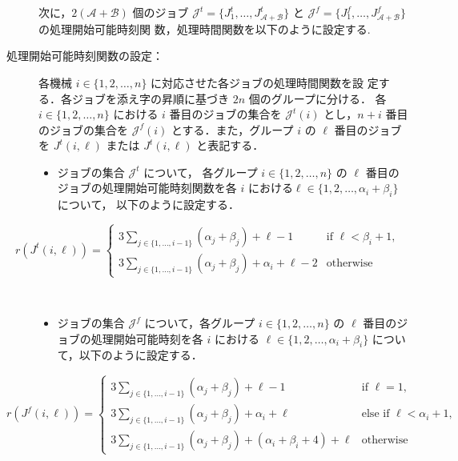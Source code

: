 \documentclass[12pt]{optlab-bachelor}
\begin{document}
\begin{description}
  \item[] 次に，$2(\mathcal{A} + \mathcal{B})$ 個のジョブ $\mathcal{J}^t =
  \{J^t_1,\ldots,J^t_{\mathcal{A} + \mathcal{B}}\}$ と $\mathcal{J}^f =
  \{J^f_1,\ldots,J^f_{\mathcal{A} + \mathcal{B}}\}$ の処理開始可能時刻関
  数，処理時間関数を以下のように設定する.
  \item[処理開始可能時刻関数の設定：] 各機械 $i \in \{1,2,\ldots,n\}$ に対応させた各ジョブの処理時間関数を設
  定する．各ジョブを添え字の昇順に基づき $2n$ 個のグループに分ける． 各 $i
  \in \{1,2,\ldots,n\}$ における $i$ 番目のジョブの集合を
  $\mathcal{J}^t(i)$ とし，$n + i$ 番目のジョブの集合を
  $\mathcal{J}^f(i)$ とする．また，グループ $i$ の $\ell$ 番目のジョブ
  を $J^t(i,\ell)$ または $J^t(i,\ell)$ と表記する．
  \begin{itemize}
    \item ジョブの集合 $\mathcal{J}^t$ について， 各グループ $i \in
    \{1,2,\ldots, n\}$ の $\ell$ 番目のジョブの処理開始可能時刻関数を各
    $i$ における$\ell \in \{1,2,\ldots, \alpha_i + \beta_i\}$ について，
    以下のように設定する．
  \end{itemize}
\end{description}
$$r(J^t(i,\ell)) =
\left\{ \begin{array}{lll} 3 \displaystyle
\sum_{j \in \{1,\ldots,i - 1\}}(\alpha_j + \beta_j) + \ell - 1 &
\text{if } \ell < \beta_i + 1, \\ 3 \displaystyle \sum_{j \in \{1,\ldots,i - 1\}}(\alpha_j + \beta_j) + \alpha_i + \ell - 2 & \text{otherwise} \end{array} \right.$$
\begin{description}
  \item[]~
  \begin{itemize}
    \item ジョブの集合 $\mathcal{J}^f$ について，各グループ $i \in \{1,2,\ldots, n\}$ の $\ell$ 番目のジョブの処理開始可能時刻を各 $i$ における $\ell \in \{1,2,\ldots,\alpha_i + \beta_i\}$ について，以下のように設定する．
  \end{itemize}
\end{description}
$$r(J^f(i,\ell)) =
\left\{ \begin{array}{lll} 3 \displaystyle \sum_{j \in \{1,\ldots,i
- 1\}}(\alpha_j + \beta_j) + \ell - 1 & \text{if } \ell = 1,
\\ 3\displaystyle \sum_{j \in \{1,\ldots,i - 1\}}(\alpha_j + \beta_j) + \alpha_i + \ell  &
\text{else if } \ell < \alpha_i + 1 , \\ 3\displaystyle \sum_{j \in \{1,\ldots,i - 1\}}(\alpha_j + \beta_j) + (\alpha_i + \beta_i + 4) + \ell & \text{otherwise} \end{array} \right.$$
\end{document}
